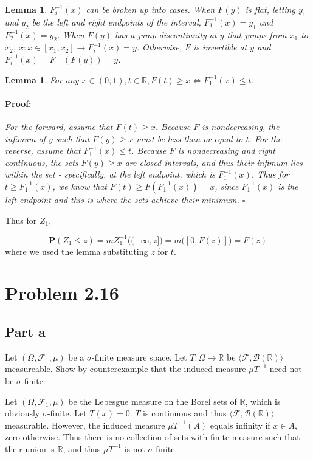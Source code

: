 \documentclass{article}
\newenvironment{proof}{\paragraph{Proof:}}{\hfill$\square$}
\newtheorem{lemma}[theorem]{Lemma}
\newcommand{\R}{\mathbb{R}}
\newcommand{\F}{\mathcal{F}}
\newcommand{\B}{\mathcal{B}}
\newcommand{\prob}{\boldsymbol{P}}
\begin{document}
\begin{lemma}
$F_i^{-1}(x)$ can be broken up into cases. When $F(y)$ is flat, letting $y_1$ and $y_2$ be the left and right endpoints of the interval, $F_1^{-1}(x) = y_1$ and $F_2^{-1}(x) = y_2$. When $F(y)$ has a jump discontinuity at $y$ that jumps from $x_1$ to $x_2$, $x:x\in[x_1, x_2] \rightarrow F_i^{-1}(x) = y$. Otherwise, $F$ is invertible at $y$ and $F_i^{-1}(x) = F^{-1}(F(y)) = y$.
\end{lemma}


\begin{lemma}
For any $x \in (0, 1), t \in \R, F(t) \geq x \Leftrightarrow F_1^{-1}(x) \leq t$.
\begin{proof}
For the forward, assume that $F(t) \geq x$. Because $F$ is nondecreasing, the infimum of $y$ such that $F(y) \geq x$ must be less than or equal to $t$. For the reverse, assume that $F_1^{-1}(x) \leq t$. Because $F$ is nondecreasing and right continuous, the sets $F(y) \geq x$ are closed intervals, and thus their infimum lies within the set - specifically, at the left endpoint, which is $F_1^{-1}(x)$. Thus for $t \geq F_1^{-1}(x)$, we know that $F(t) \geq F(F_1^{-1}(x)) = x$, since $F_1^{-1}(x)$ is the left endpoint and this is where the sets achieve their minimum.
\end{proof}
\end{lemma}

Thus for $Z_1$,

\[
\prob(Z_1 \leq z) = mZ_1^{-1}\bigl( (-\infty, z] \bigl) = m\bigl( [0, F(z)] \bigl) = F(z)
\]
where we used the lemma substituting $z$ for $t$.

\section*{Problem 2.16}

\subsection*{Part a}

Let $(\Omega, \F_1, \mu)$ be a $\sigma$-finite measure space. Let $T: \Omega \rightarrow \R$ be $\langle \F, \B(\R) \rangle$ measureable. Show by counterexample that the induced measure $\mu T^{-1}$ need not be $\sigma$-finite.

Let $(\Omega, \F_1, \mu)$ be the Lebesgue measure on the Borel sets of $\R$, which is obviously $\sigma$-finite. Let $T(x) = 0$. $T$ is continuous and thus $\langle \F, \B(\R) \rangle$ measurable. However, the induced measure $\mu T^{-1}(A)$ equals infinity if $x \in A$, zero otherwise. Thus there is no collection of sets with finite measure such that their union is $\R$, and thus $\mu T^{-1}$ is not $\sigma$-finite.
\end{document}

